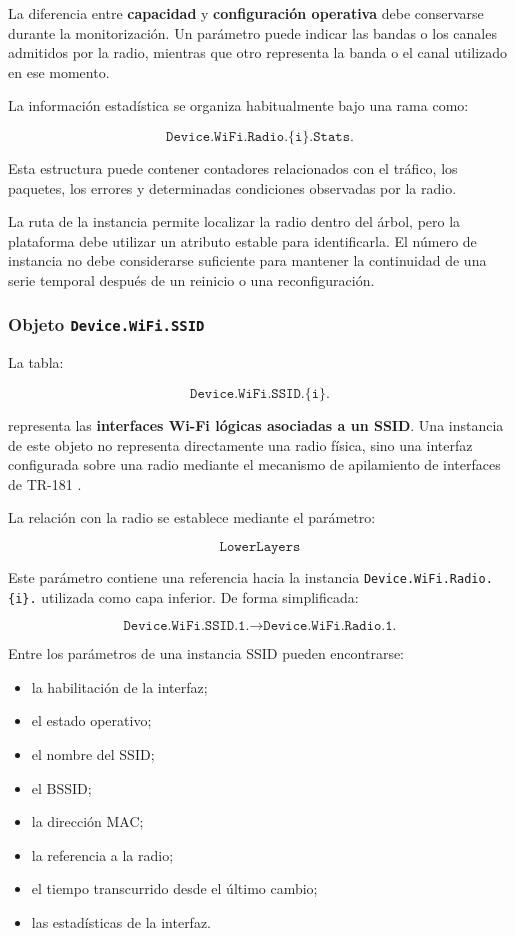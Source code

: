 La diferencia entre \textbf{capacidad} y
\textbf{configuración operativa} debe conservarse durante la
monitorización. Un parámetro puede indicar las bandas o los canales
admitidos por la radio, mientras que otro representa la banda o el canal
utilizado en ese momento.

La información estadística se organiza habitualmente bajo una rama como:

\[
    \texttt{Device.WiFi.Radio.\{i\}.Stats.}
\]

Esta estructura puede contener contadores relacionados con el tráfico,
los paquetes, los errores y determinadas condiciones observadas por la
radio.

La ruta de la instancia permite localizar la radio dentro del árbol,
pero la plataforma debe utilizar un atributo estable para identificarla.
El número de instancia no debe considerarse suficiente para mantener la
continuidad de una serie temporal después de un reinicio o una
reconfiguración.


\subsubsection*{Objeto \texttt{Device.WiFi.SSID}}

La tabla:

\[
    \texttt{Device.WiFi.SSID.\{i\}.}
\]

representa las \textbf{interfaces Wi-Fi lógicas asociadas a un SSID}. Una
instancia de este objeto no representa directamente una radio física,
sino una interfaz configurada sobre una radio mediante el mecanismo de
apilamiento de interfaces de TR-181 \cite{bbf_tr181}.

La relación con la radio se establece mediante el parámetro:

\[
    \texttt{LowerLayers}
\]

Este parámetro contiene una referencia hacia la instancia
\texttt{Device.WiFi.Radio.\{i\}.} utilizada como capa inferior. De forma
simplificada:

\[
    \texttt{Device.WiFi.SSID.1.}
    \longrightarrow
    \texttt{Device.WiFi.Radio.1.}
\]

Entre los parámetros de una instancia SSID pueden encontrarse:

\begin{itemize}
    \item la habilitación de la interfaz;
    \item el estado operativo;
    \item el nombre del SSID;
    \item el BSSID;
    \item la dirección MAC;
    \item la referencia a la radio;
    \item el tiempo transcurrido desde el último cambio;
    \item las estadísticas de la interfaz.
\end{itemize}

